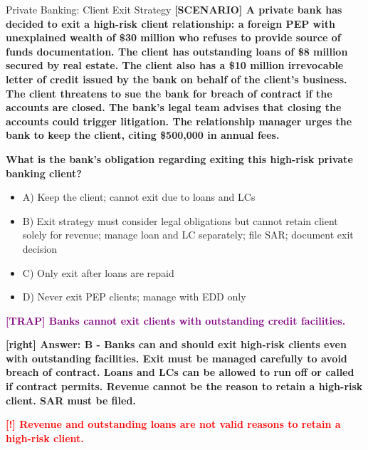 \documentclass[11pt,a4paper]{beamer}
\newcommand{\redflag}[1]{\textcolor{red}{\textbf{[!] #1}}}
\newcommand{\trap}[1]{\textcolor{purple}{\textbf{[TRAP] #1}}}
\newcommand{\correct}[1]{\textcolor{green!50!black}{\textbf{[right] #1}}}
\newcommand{\scenario}[1]{\textcolor{blue!70!black}{\textbf{[SCENARIO] #1}}}
\begin{document}
	
	\begin{frame}{Private Banking: Client Exit Strategy}
		\tiny
		\scenario{A private bank has decided to exit a high-risk client relationship: a foreign PEP with unexplained wealth of \$30 million who refuses to provide source of funds documentation. The client has outstanding loans of \$8 million secured by real estate. The client also has a \$10 million irrevocable letter of credit issued by the bank on behalf of the client's business. The client threatens to sue the bank for breach of contract if the accounts are closed. The bank's legal team advises that closing the accounts could trigger litigation. The relationship manager urges the bank to keep the client, citing \$500,000 in annual fees.}
		
		\vspace{0.02cm}
		\textbf{What is the bank's obligation regarding exiting this high-risk private banking client?}
		\vspace{0.02cm}
		
		\begin{itemize}
			\item A) Keep the client; cannot exit due to loans and LCs
			\item B) Exit strategy must consider legal obligations but cannot retain client solely for revenue; manage loan and LC separately; file SAR; document exit decision
			\item C) Only exit after loans are repaid
			\item D) Never exit PEP clients; manage with EDD only
		\end{itemize}
		
		\vspace{0.02cm}
		\trap{Banks cannot exit clients with outstanding credit facilities.}
		
		\vspace{0.02cm}
		\correct{Answer: B - Banks can and should exit high-risk clients even with outstanding facilities. Exit must be managed carefully to avoid breach of contract. Loans and LCs can be allowed to run off or called if contract permits. Revenue cannot be the reason to retain a high-risk client. SAR must be filed.}
		
		\vspace{0.02cm}
		\redflag{Revenue and outstanding loans are not valid reasons to retain a high-risk client.}
	\end{frame}
	
\end{document}
